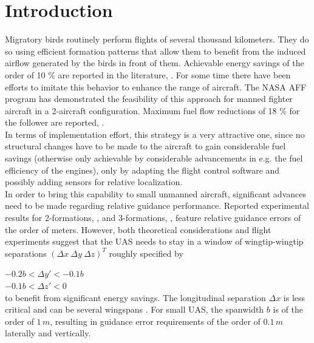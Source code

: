 \documentclass{ifacconf}
\begin{document}
\section{Introduction}
Migratory birds routinely perform flights of several thousand kilometers. They do so using efficient formation patterns that allow them to benefit from the induced airflow generated by the birds in front of them. Achievable energy savings of the order of 10 \% are reported in the literature, \cite{Weimerskirch2001}. For some time there have been efforts to imitate this behavior to enhance the range of aircraft. The NASA AFF program has demonstrated the feasibility of this approach for manned fighter aircraft in a 2-aircraft configuration. Maximum fuel flow reductions of 18 \% for the follower are reported, \cite{jake2003f}. \\
In terms of implementation effort, this strategy is a very attractive one, since no structural changes have to be made to the aircraft to gain considerable fuel savings (otherwise only achievable by considerable advancements in e.g. the fuel efficiency of the engines), only by adapting the flight control software and possibly adding sensors for relative localization. \\
In order to bring this capability to small unmanned aircraft, significant advances need to be made regarding relative guidance performance. Reported experimental results for 2-formations, \cite{Park2004}, and 3-formations, \cite{gu2006design}, feature relative guidance errors of the order of meters. However, both theoretical considerations \cite{Hummel1982} and flight experiments \cite{jake2003f} suggest that the UAS needs to stay in a window of wingtip-wingtip separations $(\Delta x \: \Delta y \: \Delta z)^T$ roughly specified by

{
\centering
$-0.2 b < \Delta y' < -0.1 b$ \\
$-0.1 b < \Delta z' < 0$ \\
}
\noindent
to benefit from significant energy savings. The longitudinal separation $\Delta x$ is less critical and can be several wingspans \cite{jake2003f}. For small UAS, the spanwidth $b$ is of the order of $1 \, m$, resulting in guidance error requirements of the order of $0.1 \, m$ laterally and vertically.
\end{document}
